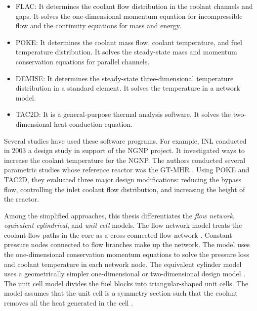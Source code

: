 \begin{itemize}
\item FLAC: It determines the coolant flow distribution in the coolant channels and gaps.
It solves the one-dimensional momentum equation for incompressible flow and the continuity equations for mass and energy.

\item POKE: It determines the coolant mass flow, coolant temperature, and fuel temperature distribution.
It solves the steady-state mass and momentum conservation equations for parallel channels.

\item DEMISE: It determines the steady-state three-dimensional temperature distribution in a standard element.
It solves the temperature in a network model.

\item TAC2D: It is a general-purpose thermal analysis software.
It solves the two-dimensional heat conduction equation.
\end{itemize}

Several studies have used these software programs.
For example, \gls{INL} conducted in 2003 a design study \cite{macdonald_ngnp_2003} in support of the \gls{NGNP} project.
It investigated ways to increase the coolant temperature for the NGNP.
The authors conducted several parametric studies whose reference reactor was the GT-MHR \cite{general_atomics_gas_1996}.
Using POKE and TAC2D, they evaluated three major design modifications: reducing the bypass flow, controlling the inlet coolant flow distribution, and increasing the height of the reactor.

Among the simplified approaches, this thesis differentiates the \textit{flow network}, \textit{equivalent cylindrical}, and \textit{unit cell} models.
The flow network model treats the coolant flow paths in the core as a cross-connected flow network \cite{shenoy_htgr_1974}.
Constant pressure nodes connected to flow branches make up the network.
The model uses the one-dimensional conservation momentum equations to solve the pressure loss and coolant temperature in each network node.
The equivalent cylinder model uses a geometrically simpler one-dimensional or two-dimensional design model \cite{shenoy_htgr_1974}\cite{tak_numerical_2008}.
The unit cell model divides the fuel blocks into triangular-shaped unit cells.
The model assumes that the unit cell is a symmetry section such that the coolant removes all the heat generated in the cell \cite{tak_numerical_2008}.

